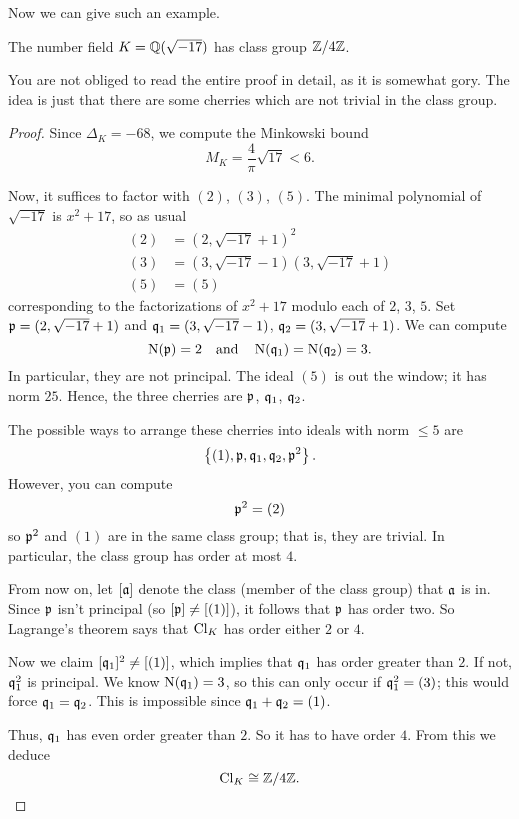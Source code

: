 Now we can give such an example.
\begin{proposition}
	The number field $K = \mathbb Q(\sqrt{-17})$ has class group $\mathbb Z/4\mathbb Z$.
\end{proposition}
You are not obliged to read the entire proof in detail,
as it is somewhat gory.
The idea is just that there are some cherries which are not trivial in the class group.
\begin{proof}
Since $\Delta_K = -68$, we compute
the Minkowski bound
\[ M_K = \frac{4}{\pi} \sqrt{17} < 6. \]

Now, it suffices to factor with $(2)$, $(3)$, $(5)$.
The minimal polynomial of $\sqrt{-17}$ is $x^2+17$, so as usual
\begin{align*}
	(2) &= (2, \sqrt{-17}+1)^2 \\
	(3) &= (3, \sqrt{-17}-1)(3,\sqrt{-17}+1) \\
	(5) &= (5)
\end{align*}
corresponding to the factorizations of $x^2+17$ modulo each of $2$, $3$, $5$.
Set $\mathfrak p = (2, \sqrt{-17}+1)$ and $\mathfrak q_1 = (3, \sqrt{-17}-1)$, $\mathfrak q_2 = (3, \sqrt{-17}+1)$.
We can compute
\[ \operatorname{N}(\mathfrak p) = 2 \quad\text{and}\quad \operatorname{N}(\mathfrak q_1) = \operatorname{N}(\mathfrak q_2) = 3. \]
In particular, they are not principal.
The ideal $(5)$ is out the window; it has norm $25$.
Hence, the three cherries are $\mathfrak p$, $\mathfrak q_1$, $\mathfrak q_2$.

The possible ways to arrange these cherries into ideals with norm $\le 5$ are
\[ \left\{ (1), \mathfrak p, \mathfrak q_1, \mathfrak q_2, \mathfrak p^2 \right\}. \]
However, you can compute \[ \mathfrak p^2 = (2) \] so $\mathfrak p^2$ and $(1)$ are in the same class group;
that is, they are trivial.
In particular, the class group has order at most $4$.

From now on, let $[\mathfrak a]$ denote the class (member of the class group) that $\mathfrak a$ is in.
Since $\mathfrak p$ isn't principal (so $[\mathfrak p] \neq [(1)]$), it follows that $\mathfrak p$ has order two.
So Lagrange's theorem says that $\mathrm{Cl}_K$ has order either $2$ or $4$.

Now we claim $[\mathfrak q_1]^2 \neq [(1)]$, which implies that $\mathfrak q_1$ has order greater than $2$.
If not, $\mathfrak q_1^2$ is principal.
We know $\operatorname{N}(\mathfrak q_1) = 3$,
so this can only occur if $\mathfrak q_1^2 = (3)$;
this would force $\mathfrak q_1 = \mathfrak q_2$.
This is impossible since $\mathfrak q_1 + \mathfrak q_2 = (1)$.

Thus, $\mathfrak q_1$ has even order greater than $2$.
So it has to have order $4$.
From this we deduce \[ \mathrm{Cl}_K \cong \mathbb Z/4\mathbb Z. \qedhere \]
\end{proof}





